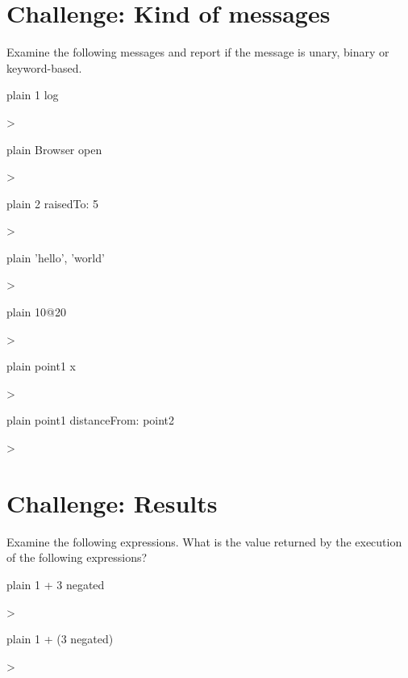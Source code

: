 \documentclass[10pt,twoside,english]{_support/latex/sbabook/sbabook}
\begin{document}
\section{Challenge: Kind of messages}
Examine the following messages and report if the message is unary, binary or keyword-based.

\begin{displaycode}{plain}
1 log

>
\end{displaycode}

\begin{displaycode}{plain}
Browser open

>
\end{displaycode}

\begin{displaycode}{plain}
2 raisedTo: 5

>
\end{displaycode}

\begin{displaycode}{plain}
'hello', 'world'

>
\end{displaycode}

\begin{displaycode}{plain}
10@20

>
\end{displaycode}

\begin{displaycode}{plain}
point1 x

> 
\end{displaycode}

\begin{displaycode}{plain}
point1 distanceFrom: point2

>
\end{displaycode}
\section{Challenge: Results}
Examine the following expressions. What is the value returned by the execution of the following expressions?

\begin{displaycode}{plain}
1 + 3 negated

>
\end{displaycode}

\begin{displaycode}{plain}
1 + (3 negated)

>
\end{displaycode}
\end{document}
